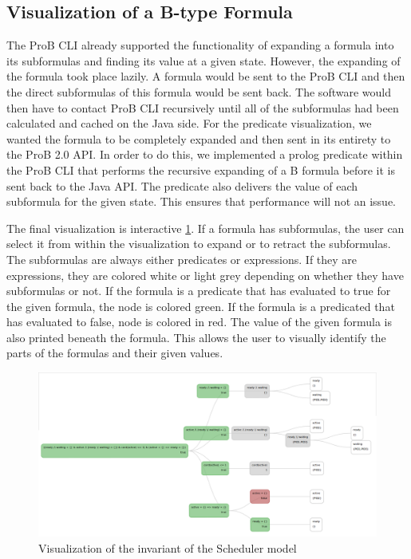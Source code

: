 \subsection{Visualization of a B-type Formula}

The ProB CLI already supported the functionality of expanding a formula into its subformulas and finding its value at a given state. However, the expanding of the formula took place lazily. A formula would be sent to the ProB CLI and then the direct subformulas of this formula would be sent back. The software would then have to contact ProB CLI recursively until all of the subformulas had been calculated and cached on the Java side. For the predicate visualization, we wanted the formula to be completely expanded and then sent in its entirety to the ProB 2.0 API. In order to do this, we implemented a prolog predicate within the ProB CLI that performs the recursive expanding of a B formula before it is sent back to the Java API. The predicate also delivers the value of each subformula for the given state. This ensures that performance will not an issue. 

The final visualization is interactive \ref{predicate}. If a formula has subformulas, the user can select it from within the visualization to expand or to retract the subformulas. The subformulas are always either predicates or expressions. If they are expressions, they are colored white or light grey depending on whether they have subformulas or not. If the formula is a predicate that has evaluated to true for the given formula, the node is colored green. If the formula is a predicated that has evaluated to false, node is colored in red. The value of the given formula is also printed beneath the formula. This allows the user to visually identify the parts of the formulas and their given values. 

\begin{figure}[h!]
\centering
\includegraphics[width=15cm]{bilder/invariant.png}
\caption{Visualization of the invariant of the Scheduler model}
\label{predicate}
\end{figure}

